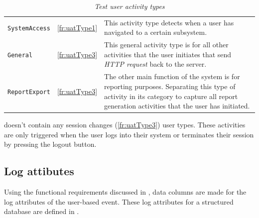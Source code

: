 \begin{table}[!htb]
	\centering
	\caption[Test user activity types]{\textit{Test user activity types}}
	\label{tbl:ch3_testActivityTypes}
	\begin{tabularx}{\textwidth}{llX}
		\toprule
		\thead{Activity} & \thead{Functional requirement} & \thead{Description} \\
		\midrule
		\rowcolor{lightgray}
		\texttt{SystemAccess} & \ref{fr:uatType1} & \RaggedRight This activity type detects when a user has navigated to a certain subsystem. \\ 
		\texttt{General} & \ref{fr:uatType3} & \RaggedRight This general activity type is for all other activities that the user initiates that send \textit{HTTP request} back to the server. \\
		\rowcolor{lightgray}
		\texttt{ReportExport} & \ref{fr:uatType3} & \RaggedRight The other main function of the system is for reporting purposes. Separating this type of activity in its category to capture all report generation activities that the user has initiated. \\ 
		\bottomrule
	\end{tabularx}
\end{table}

 doesn't contain any session changes (\ref{fr:uatType3}) user types. These activities are only triggered when the user logs into their system or terminates their session by pressing the logout button.

\subsection{Log attibutes}\label{sec:ch3_implementationLogAtrributes}
Using the functional requirements discussed in , data columns are made for the log attributes of the user-based event. These log attributes for a structured database are defined in . 

